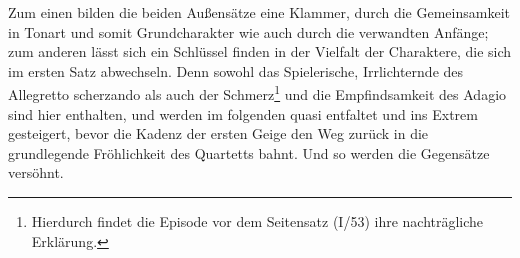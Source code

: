 Zum einen bilden die beiden Außensätze eine Klammer, durch die Gemeinsamkeit
in Tonart und somit Grundcharakter wie auch durch die verwandten Anfänge;
zum anderen lässt sich ein Schlüssel finden in der Vielfalt der Charaktere,
die sich im ersten Satz abwechseln.  Denn sowohl das Spielerische,
Irrlichternde des Allegretto scherzando als auch der Schmerz\footnote{Hierdurch
findet die Episode vor dem Seitensatz (I/53) ihre nachträgliche Erklärung.} und die
Empfindsamkeit des Adagio sind hier enthalten, und werden im folgenden quasi
entfaltet und ins Extrem gesteigert, bevor die Kadenz der ersten Geige den
Weg zurück in die grundlegende Fröhlichkeit des Quartetts bahnt.  Und so werden
die Gegensätze versöhnt.
